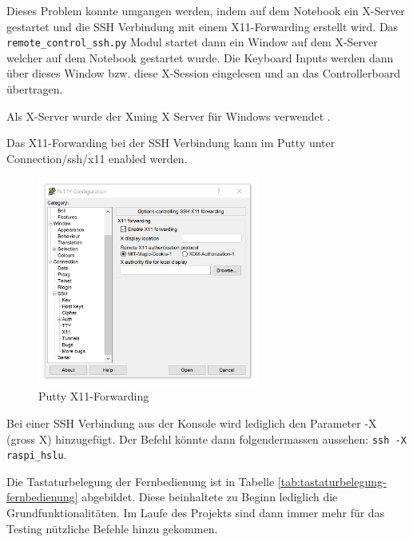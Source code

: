 Dieses Problem konnte umgangen werden, indem auf dem Notebook ein X-Server \cite{Wikipedia-X-Window-System} gestartet und die SSH Verbindung mit einem X11-Forwarding erstellt wird. Das \texttt{remote\_control\_ssh.py} Modul startet dann ein Window auf dem X-Server welcher auf dem Notebook gestartet wurde. Die Keyboard Inputs werden dann über dieses Window bzw. diese X-Session eingelesen und an das Controllerboard übertragen. 

Als X-Server wurde der Xming X Server für Windows verwendet \cite{Xming-X-Window-Server-Download}.

Das X11-Forwarding bei der SSH Verbindung kann im Putty unter Connection/ssh/x11 enabled werden. 

\begin{figure}[H]
  \includegraphics[width=0.65\textwidth]{img/remote_control/putty_x11.PNG}
  \centering
  \caption{Putty X11-Forwarding}
  \label{fig:putty_x11_forwarding}
\end{figure}


Bei einer SSH Verbindung aus der Konsole wird lediglich den Parameter -X (gross X) hinzugefügt. Der Befehl könnte dann folgendermassen aussehen: \texttt{ssh -X raspi\_hslu}.

Die Tastaturbelegung der Fernbedienung ist in Tabelle \ref{tab:tastaturbelegung-fernbedienung} abgebildet. Diese beinhaltete zu Beginn lediglich die Grundfunktionalitäten. Im Laufe des Projekts sind dann immer mehr für das Testing nützliche Befehle hinzu gekommen.\\

